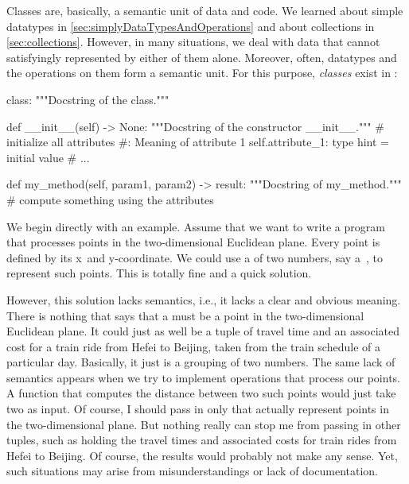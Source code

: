 %
%
Classes are, basically, a semantic unit of data and code.
We learned about simple datatypes in \cref{sec:simplyDataTypesAndOperations} and about collections in \cref{sec:collections}.
However, in many situations, we deal with data that cannot satisfyingly represented by either of them alone.
Moreover, often, datatypes and the operations on them form a semantic unit.
For this purpose, \emph{classes} exist in \python{}:%
%
\begin{pythonSyntax}
class:
    """Docstring of the class."""

    def __init__(self) -> None:
        """Docstring of the constructor __init__."""
        # initialize all attributes
        #: Meaning of attribute 1
        self.attribute_1: type hint = initial value
        # ...

    def my_method(self, param1, param2) -> result:
        """Docstring of my_method."""
        # compute something using the attributes
\end{pythonSyntax}
%
%
%
%
%
%
%
We begin directly with an example.
Assume that we want to write a program that processes points in the two-dimensional Euclidean plane.
Every point is defined by its x\nobreakdashes~and y\nobreakdashes-coordinate.
We could use a  of two numbers, say a~, to represent such points.
This is totally fine and a quick solution.

However, this solution lacks semantics, i.e., it lacks a clear and obvious meaning.
There is nothing that says that a  must be a point in the two-dimensional Euclidean plane.
It could just as well be a tuple of travel time and an associated cost for a train ride from Hefei to Beijing, taken from the train schedule of a particular day.
Basically, it just is a grouping of two numbers.
The same lack of semantics appears when we try to implement operations that process our points.
A function that computes the distance between two such points would just take two  as input.
Of course, I should pass in only  that actually represent points in the two-dimensional plane.
But nothing really can stop me from passing in other tuples, such as  holding the travel times and associated costs for train rides from Hefei to Beijing.
Of course, the results would probably not make any sense.
Yet, such situations may arise from misunderstandings or lack of documentation.


